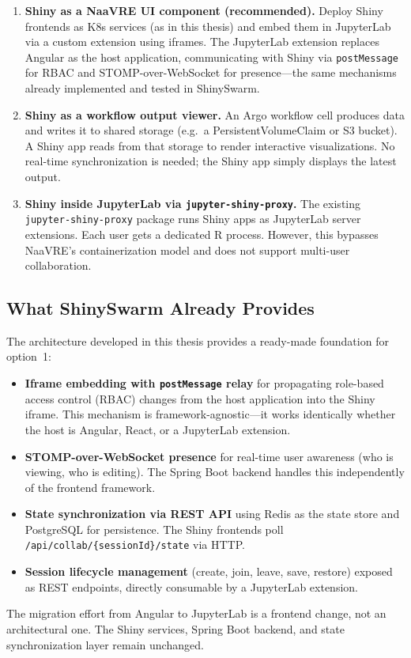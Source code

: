 \documentclass[11pt,a4paper]{article}
\begin{document}
\begin{enumerate}
  \item \textbf{Shiny as a NaaVRE UI component (recommended).}
        Deploy Shiny frontends as K8s services (as in this thesis) and
        embed them in JupyterLab via a custom extension using iframes.
        The JupyterLab extension replaces Angular as the host application,
        communicating with Shiny via \texttt{postMessage} for RBAC and
        STOMP-over-WebSocket for presence---the same mechanisms already
        implemented and tested in ShinySwarm.

  \item \textbf{Shiny as a workflow output viewer.}
        An Argo workflow cell produces data and writes it to shared
        storage (e.g.\ a PersistentVolumeClaim or S3 bucket). A Shiny
        app reads from that storage to render interactive visualizations.
        No real-time synchronization is needed; the Shiny app simply
        displays the latest output.

  \item \textbf{Shiny inside JupyterLab via \texttt{jupyter-shiny-proxy}.}
        The existing \texttt{jupyter-shiny-proxy} package runs Shiny
        apps as JupyterLab server extensions. Each user gets a dedicated
        R process. However, this bypasses NaaVRE's containerization model
        and does not support multi-user collaboration.
\end{enumerate}

\subsection{What ShinySwarm Already Provides}

The architecture developed in this thesis provides a ready-made
foundation for option~1:

\begin{itemize}
  \item \textbf{Iframe embedding with \texttt{postMessage} relay} for
        propagating role-based access control (RBAC) changes from the
        host application into the Shiny iframe. This mechanism is
        framework-agnostic---it works identically whether the host is
        Angular, React, or a JupyterLab extension.
  \item \textbf{STOMP-over-WebSocket presence} for real-time user
        awareness (who is viewing, who is editing). The Spring Boot
        backend handles this independently of the frontend framework.
  \item \textbf{State synchronization via REST API} using Redis as the
        state store and PostgreSQL for persistence. The Shiny frontends
        poll \texttt{/api/collab/\{sessionId\}/state} via HTTP.
  \item \textbf{Session lifecycle management} (create, join, leave, save,
        restore) exposed as REST endpoints, directly consumable by a
        JupyterLab extension.
\end{itemize}

The migration effort from Angular to JupyterLab is a frontend change,
not an architectural one. The Shiny services, Spring Boot backend, and
state synchronization layer remain unchanged.
\end{document}
